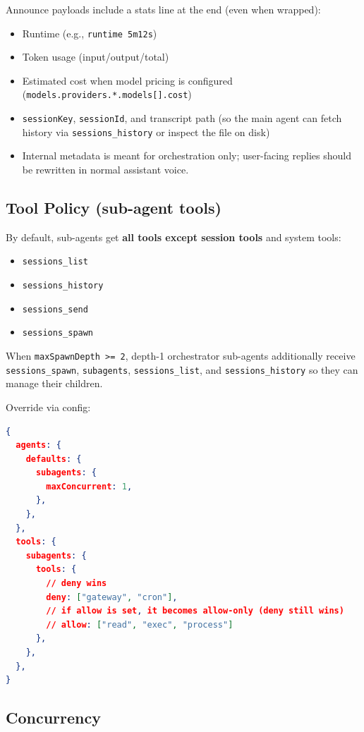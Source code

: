 Announce payloads include a stats line at the end (even when wrapped):

\begin{itemize}
  \item Runtime (e.g., \texttt{runtime 5m12s})
  \item Token usage (input/output/total)
  \item Estimated cost when model pricing is configured (\texttt{models.providers.*.models[].cost})
  \item \texttt{sessionKey}, \texttt{sessionId}, and transcript path (so the main agent can fetch history via \texttt{sessions\_history} or inspect the file on disk)
  \item Internal metadata is meant for orchestration only; user-facing replies should be rewritten in normal assistant voice.
\end{itemize}


\subsection{Tool Policy (sub-agent tools)}


By default, sub-agents get \textbf{all tools except session tools} and system tools:

\begin{itemize}
  \item \texttt{sessions\_list}
  \item \texttt{sessions\_history}
  \item \texttt{sessions\_send}
  \item \texttt{sessions\_spawn}
\end{itemize}


When \texttt{maxSpawnDepth >= 2}, depth-1 orchestrator sub-agents additionally receive \texttt{sessions\_spawn}, \texttt{subagents}, \texttt{sessions\_list}, and \texttt{sessions\_history} so they can manage their children.

Override via config:

\begin{lstlisting}[language=json]
{
  agents: {
    defaults: {
      subagents: {
        maxConcurrent: 1,
      },
    },
  },
  tools: {
    subagents: {
      tools: {
        // deny wins
        deny: ["gateway", "cron"],
        // if allow is set, it becomes allow-only (deny still wins)
        // allow: ["read", "exec", "process"]
      },
    },
  },
}
\end{lstlisting}


\subsection{Concurrency}


